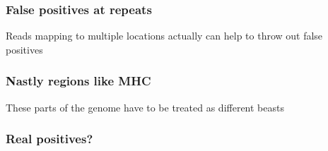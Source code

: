 \documentclass{beamer}
\begin{document}
\begin{frame}
\frametitle{False positives at repeats}
Reads mapping to multiple locations actually can help to throw out false positives
\end{frame}

\begin{frame}
\frametitle{Nastly regions like MHC}
These parts of the genome have to be treated as different beasts
\end{frame}

\begin{frame}
\frametitle{Real positives?}
\end{frame}
\end{document}
